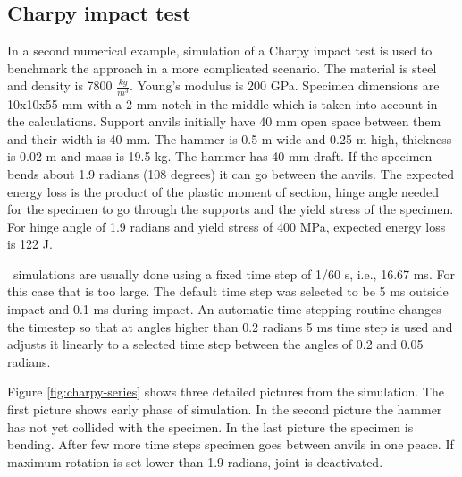 \subsection{Charpy impact test}
In a second numerical example, simulation of a Charpy impact test is
used to benchmark the approach in a more complicated scenario. 
The material is steel and density is 7800 $\frac{kg}{m^{3}}$. Young’s modulus is 200 GPa.
Specimen dimensions are 10x10x55 mm with a 2 mm notch in the middle which is taken into account in the calculations.
Support anvils initially have 40 mm open space between them and their width is 40 mm. 
The hammer is 0.5 m wide and 0.25 m high, thickness is 0.02 m and mass is 19.5 kg.
The hammer has 40 mm draft.
If the specimen bends about 1.9 radians (108 degrees) it can go between the anvils.
The expected energy loss is the product of the plastic moment of section, 
hinge angle needed for the specimen to go through the supports and 
the yield stress of the specimen. For hinge angle of 1.9 radians and yield stress of 400 MPa, expected energy 
loss is 122 J.

\bullet\ simulations are usually done using a fixed time step of 1/60 s, i.e., 16.67 ms. 
For this case that is too large. 
The default time step was selected to be 5 ms outside impact  and 0.1 ms during impact. 
An automatic time stepping routine changes the timestep so that at angles higher than 0.2 radians 5 ms time step is
used and adjusts it linearly to a selected time step between the angles of 0.2 and 0.05 radians.

Figure \ref{fig:charpy-series} shows three detailed pictures from the simulation.
The first picture shows early phase of simulation. 
In the second picture the hammer has not yet collided with the specimen.
In the last picture the specimen is bending. 
After few more time steps specimen goes between anvils in one peace.
If maximum rotation is set lower than 1.9 radians, joint is deactivated.

